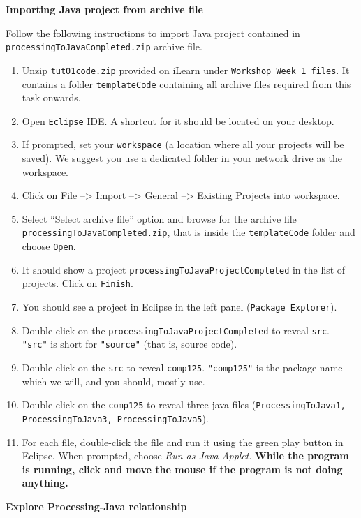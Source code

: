 \begin{questions}
\question \textbf{Importing Java project from archive file} \vskip 0.5cm

Follow the following instructions to import Java project contained in \texttt{processingToJavaCompleted.zip} archive file.

\begin{enumerate}
\item Unzip \texttt{tut01code.zip} provided on iLearn under \texttt{Workshop Week 1 files}. It contains a folder \texttt{templateCode} containing all archive files required from this task onwards.
\item Open \texttt{Eclipse} IDE. A shortcut for it should be located on your desktop.
\item If prompted, set your \texttt{workspace} (a location where all your projects will be saved). We suggest you use a dedicated folder in your network drive as the workspace.
\item Click on File --> Import --> General --> Existing Projects into workspace.
\item Select ``Select archive file'' option and browse for the archive file \texttt{processingToJavaCompleted.zip}, that is inside the \texttt{templateCode} folder and choose \texttt{Open}.
\item It should show a project \texttt{processingToJavaProjectCompleted} in the list of projects. Click on \texttt{Finish}.
\item You should see a project in Eclipse in the left panel (\texttt{Package Explorer}).
\item Double click on the \texttt{processingToJavaProjectCompleted} to reveal \texttt{src}. \texttt{"src"} is short for \texttt{"source"} (that is, source code).
\item Double click on the \texttt{src} to reveal \texttt{comp125}. \texttt{"comp125"} is the package name which we will, and you should, mostly use.
\item Double click on the \texttt{comp125} to reveal three java files (\texttt{ProcessingToJava1, ProcessingToJava3, ProcessingToJava5}). 
\item For each file, double-click the file and run it using the green play button in Eclipse. When prompted, choose \emph{Run as Java Applet}. \textbf{While the program is running, click and move the mouse if the program is not doing anything.}
\end{enumerate}

\question \textbf{Explore Processing-Java relationship} \vskip 0.5cm


\end{questions}
